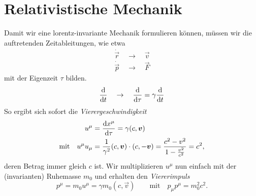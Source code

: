\section{Relativistische Mechanik}

Damit wir eine lorentz-invariante Mechanik formulieren können, müssen wir die auftretenden Zeitableitungen, wie etwa
\begin{align*}
\dot{\vec{r}} \quad \rightarrow \quad \vec{v}\\
\dot{\vec{p}}\quad\rightarrow\quad\vec{F}
\end{align*}
mit der Eigenzeit $\tau$ bilden. 
\begin{equation*}
\frac{\mathrm{d}{}}{\mathrm{d}{t}}\quad\rightarrow\quad\frac{\mathrm{d}{}}{\mathrm{d}{\tau}}=\gamma\frac{\mathrm{d}{}}{\mathrm{d}{t}}
\end{equation*}
So ergibt sich sofort die \emph{Vierergeschwindigkeit}
\begin{align*}
u^\mu &= \frac{\mathrm{d}{x^\mu}}{\mathrm{d}{\tau}} = \gamma(c,\bm{v})\\
\text{mit}\quad u^\mu u_\mu &= \frac{1}{\gamma^2}(c,\bm{v})\cdot (c,-\bm{v}) = \frac{c^2-v^2}{1-\frac{v^2}{c^2}} = c^2,
\end{align*}
deren Betrag immer gleich $c$ ist. Wir multiplizieren $u^\mu$ nun einfach mit der (invarianten) Ruhemasse $m_0$ und erhalten den \emph{Viererimpuls}
\begin{equation*}
p^\mu = m_0 u^\mu = \gamma m_0 \left(c,\vec{v}\right)\qquad\text{mit}\quad p_\mu p^\mu = m_0^2c^2.
\end{equation*}

